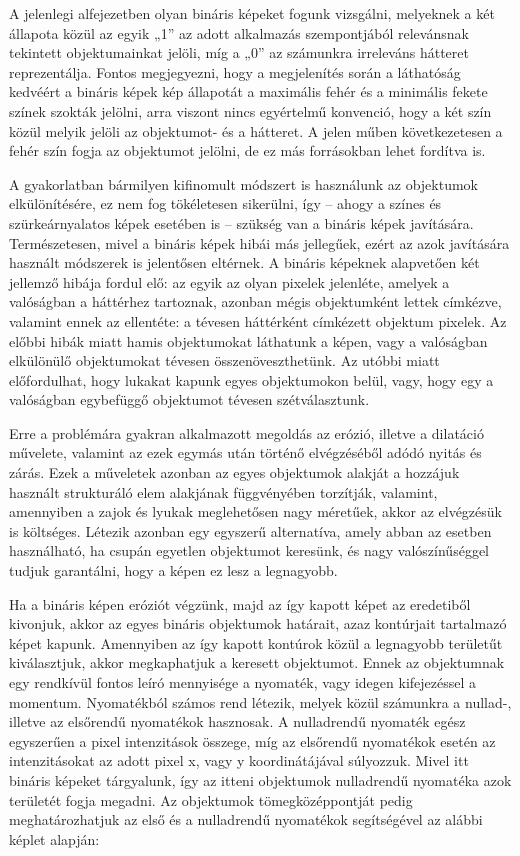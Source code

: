 \documentclass[12pt,a4paper,oneside]{report}             %
\begin{document}
A jelenlegi alfejezetben olyan bináris képeket fogunk vizsgálni, melyeknek a két állapota közül az egyik „1” az adott alkalmazás szempontjából relevánsnak tekintett objektumainkat jelöli, míg a „0” az számunkra irreleváns hátteret reprezentálja. Fontos megjegyezni, hogy a megjelenítés során a láthatóság kedvéért a bináris képek kép állapotát a maximális fehér és a minimális fekete színek szokták jelölni, arra viszont nincs egyértelmű konvenció, hogy a két szín közül melyik jelöli az objektumot- és a hátteret. A jelen műben következetesen a fehér szín fogja az objektumot jelölni, de ez más forrásokban lehet fordítva is.

A gyakorlatban bármilyen kifinomult módszert is használunk az objektumok elkülönítésére, ez nem fog tökéletesen sikerülni, így – ahogy a színes és szürkeárnyalatos képek esetében is – szükség van a bináris képek javítására. Természetesen, mivel a bináris képek hibái más jellegűek, ezért az azok javítására használt módszerek is jelentősen eltérnek. A bináris képeknek alapvetően két jellemző hibája fordul elő: az egyik az olyan pixelek jelenléte, amelyek a valóságban a háttérhez tartoznak, azonban mégis objektumként lettek címkézve, valamint ennek az ellentéte: a tévesen háttérként címkézett objektum pixelek. Az előbbi hibák miatt hamis objektumokat láthatunk a képen, vagy a valóságban elkülönülő objektumokat tévesen összenöveszthetünk. Az utóbbi miatt előfordulhat, hogy lukakat kapunk egyes objektumokon belül, vagy, hogy egy a valóságban egybefüggő objektumot tévesen szétválasztunk.

Erre a problémára gyakran alkalmazott megoldás az erózió, illetve a dilatáció művelete, valamint az ezek egymás után történő elvégzéséből adódó nyitás és zárás. Ezek a műveletek azonban az egyes objektumok alakját a hozzájuk használt strukturáló elem alakjának függvényében torzítják, valamint, amennyiben a zajok és lyukak meglehetősen nagy méretűek, akkor az elvégzésük is költséges. Létezik azonban egy egyszerű alternatíva, amely abban az esetben használható, ha csupán egyetlen objektumot keresünk, és nagy valószínűséggel tudjuk garantálni, hogy a képen ez lesz a legnagyobb.

Ha a bináris képen eróziót végzünk, majd az így kapott képet az eredetiből kivonjuk, akkor az egyes bináris objektumok határait, azaz kontúrjait tartalmazó képet kapunk. Amennyiben az így kapott kontúrok közül a legnagyobb területűt kiválasztjuk, akkor megkaphatjuk a keresett objektumot. Ennek az objektumnak egy rendkívül fontos leíró mennyisége a nyomaték, vagy idegen kifejezéssel a momentum. Nyomatékból számos rend létezik, melyek közül számunkra a nullad-, illetve az elsőrendű nyomatékok hasznosak. A nulladrendű nyomaték egész egyszerűen a pixel intenzitások összege, míg az elsőrendű nyomatékok esetén az intenzitásokat az adott pixel x, vagy y koordinátájával súlyozzuk. Mivel itt bináris képeket tárgyalunk, így az itteni objektumok nulladrendű nyomatéka azok területét fogja megadni. Az objektumok tömegközéppontját pedig meghatározhatjuk az első és a nulladrendű nyomatékok segítségével az alábbi képlet alapján:
\end{document}
